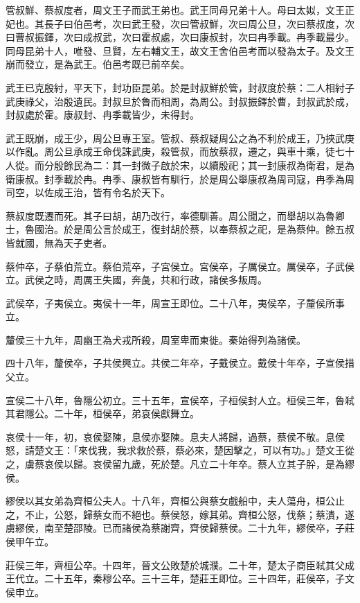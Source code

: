
\begin{pinyinscope}
管叔鮮、蔡叔度者，周文王子而武王弟也。武王同母兄弟十人。母曰太姒，文王正妃也。其長子曰伯邑考，次曰武王發，次曰管叔鮮，次曰周公旦，次曰蔡叔度，次曰曹叔振鐸，次曰成叔武，次曰霍叔處，次曰康叔封，次曰冉季載。冉季載最少。同母昆弟十人，唯發、旦賢，左右輔文王，故文王舍伯邑考而以發為太子。及文王崩而發立，是為武王。伯邑考既已前卒矣。

武王已克殷紂，平天下，封功臣昆弟。於是封叔鮮於管，封叔度於蔡：二人相紂子武庚祿父，治殷遺民。封叔旦於魯而相周，為周公。封叔振鐸於曹，封叔武於成，封叔處於霍。康叔封、冉季載皆少，未得封。

武王既崩，成王少，周公旦專王室。管叔、蔡叔疑周公之為不利於成王，乃挾武庚以作亂。周公旦承成王命伐誅武庚，殺管叔，而放蔡叔，遷之，與車十乘，徒七十人從。而分殷餘民為二：其一封微子啟於宋，以續殷祀；其一封康叔為衛君，是為衛康叔。封季載於冉。冉季、康叔皆有馴行，於是周公舉康叔為周司寇，冉季為周司空，以佐成王治，皆有令名於天下。

蔡叔度既遷而死。其子曰胡，胡乃改行，率德馴善。周公聞之，而舉胡以為魯卿士，魯國治。於是周公言於成王，復封胡於蔡，以奉蔡叔之祀，是為蔡仲。餘五叔皆就國，無為天子吏者。

蔡仲卒，子蔡伯荒立。蔡伯荒卒，子宮侯立。宮侯卒，子厲侯立。厲侯卒，子武侯立。武侯之時，周厲王失國，奔彘，共和行政，諸侯多叛周。

武侯卒，子夷侯立。夷侯十一年，周宣王即位。二十八年，夷侯卒，子釐侯所事立。

釐侯三十九年，周幽王為犬戎所殺，周室卑而東徙。秦始得列為諸侯。

四十八年，釐侯卒，子共侯興立。共侯二年卒，子戴侯立。戴侯十年卒，子宣侯措父立。

宣侯二十八年，魯隱公初立。三十五年，宣侯卒，子桓侯封人立。桓侯三年，魯弒其君隱公。二十年，桓侯卒，弟哀侯獻舞立。

哀侯十一年，初，哀侯娶陳，息侯亦娶陳。息夫人將歸，過蔡，蔡侯不敬。息侯怒，請楚文王：「來伐我，我求救於蔡，蔡必來，楚因擊之，可以有功。」楚文王從之，虜蔡哀侯以歸。哀侯留九歲，死於楚。凡立二十年卒。蔡人立其子肸，是為繆侯。

繆侯以其女弟為齊桓公夫人。十八年，齊桓公與蔡女戲船中，夫人蕩舟，桓公止之，不止，公怒，歸蔡女而不絕也。蔡侯怒，嫁其弟。齊桓公怒，伐蔡；蔡潰，遂虜繆侯，南至楚邵陵。已而諸侯為蔡謝齊，齊侯歸蔡侯。二十九年，繆侯卒，子莊侯甲午立。

莊侯三年，齊桓公卒。十四年，晉文公敗楚於城濮。二十年，楚太子商臣弒其父成王代立。二十五年，秦穆公卒。三十三年，楚莊王即位。三十四年，莊侯卒，子文侯申立。


\end{pinyinscope}
